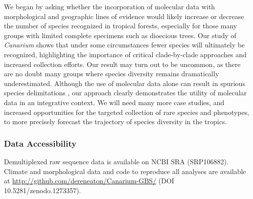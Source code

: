 \documentclass[10pt,letterpaper]{article}
\begin{document}
We began by asking whether the incorporation of molecular data with morphological and geographic lines of evidence would likely increase or decrease the number of species recognized in tropical forests, especially for those many groups with limited complete specimens such as dioecious trees. Our study of \emph{Canarium} shows that under some circumstances fewer species will ultimately be recognized, highlighting the importance of critical clade-by-clade approaches and increased collection efforts. Our result may turn out to be uncommon, as there are no doubt many groups where species diversity remains dramatically underestimated. Although the use of molecular data alone can result in spurious species delimitations \cite{sukumaran_multispecies_2017}, our approach clearly demonstrates the utility of molecular data in an integrative context. We will need many more case studies, and increased opportunities for the targeted collection of rare species and phenotypes, to more precisely forecast the trajectory of species diversity in the tropics.      

\subsubsection*{Data Accessibility}
Demultiplexed raw sequence data is available on NCBI SRA (SRP106882). Climate and morphological data and code to reproduce all analyses are available at \url{http://github.com/dereneaton/Canarium-GBS/} (DOI 10.5281/zenodo.1273357).




\end{document}
